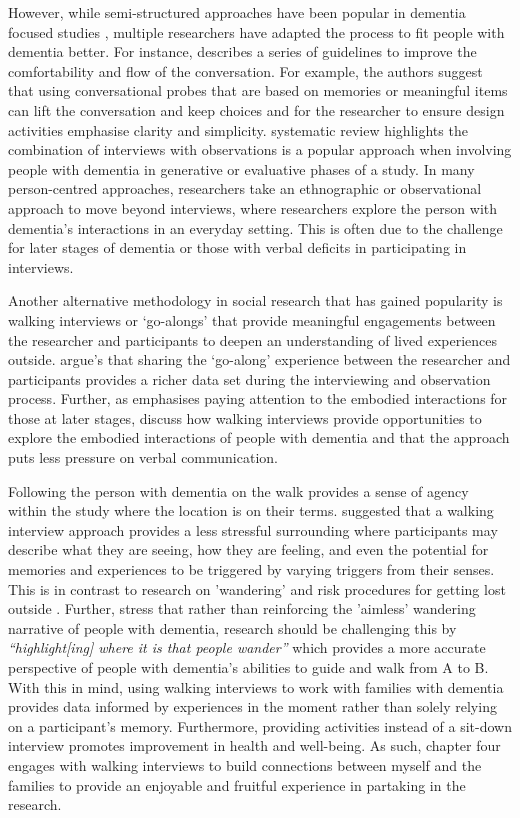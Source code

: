 However, while semi-structured approaches have been popular in dementia focused studies \citep{samsi_everyday_2013}, multiple researchers have adapted the process to fit people with dementia better. For instance, \cite{mayer2013lessons} describes a series of guidelines to improve the comfortability and flow of the conversation. For example, the authors suggest that using conversational probes that are based on memories or meaningful items can lift the conversation and keep choices and for the researcher to ensure design activities emphasise clarity and simplicity. \cite{suijkerbuijk_active_2019} systematic review highlights the combination of interviews with observations is a popular approach when involving people with dementia in generative or evaluative phases of a study. In many person-centred approaches, researchers take an ethnographic or observational approach to move beyond interviews, where researchers explore the person with dementia's interactions in an everyday setting. This is often due to the challenge for later stages of dementia or those with verbal deficits in participating in interviews.

Another alternative methodology in social research that has gained popularity is walking interviews or `go-alongs' that provide meaningful engagements between the researcher and participants to deepen an understanding of lived experiences outside. \cite{hein2008mobile} argue's that sharing the `go-along' experience between the researcher and participants provides a richer data set during the interviewing and observation process. Further, as \cite{foley_struggle_2019} emphasises paying attention to the embodied interactions for those at later stages, \cite{kullberg2017walking}  discuss how walking interviews provide opportunities to explore the embodied interactions of people with dementia and that the approach puts less pressure on verbal communication. 

Following the person with dementia on the walk provides a sense of agency within the study where the location is on their terms. \cite{kullberg2017walking}  suggested that a walking interview approach provides a less stressful surrounding where participants may describe what they are seeing, how they are feeling, and even the potential for memories and experiences to be triggered by varying triggers from their senses. This is in contrast to research on 'wandering' and risk procedures for getting lost outside \citep{odzakovic2020verjoyed}. Further, \cite{brittain2017walking} stress that rather than reinforcing the 'aimless' wandering narrative of people with dementia, research should be challenging this by \textit{``highlight[ing] where it is that people wander''} which provides a more accurate perspective of people with dementia's abilities to guide and walk from A to B. With this in mind, using walking interviews to work with families with dementia provides data informed by experiences in the moment rather than solely relying on a participant's memory. Furthermore, providing activities instead of a sit-down interview promotes improvement in health and well-being. As such, chapter four engages with walking interviews to build connections between myself and the families to provide an enjoyable and fruitful experience in partaking in the research.

